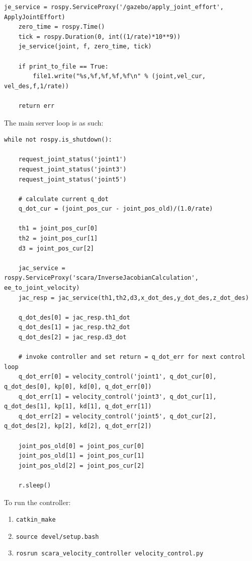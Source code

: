 \documentclass[10pt]{article}
\begin{document}
\begin{enumerate}
\begin{lstlisting}[style=Matlab-editor,basicstyle=\mlttfamily,escapechar=`]
	je_service = rospy.ServiceProxy('/gazebo/apply_joint_effort', ApplyJointEffort)
	zero_time = rospy.Time()
	tick = rospy.Duration(0, int((1/rate)*10**9))
	je_service(joint, f, zero_time, tick)
	
	if print_to_file == True:
		file1.write("%s,%f,%f,%f,%f\n" % (joint,vel_cur, vel_des,f,1/rate)) 
	
	return err
\end{lstlisting}	

	The main server loop is as such:
	
\begin{lstlisting}[style=Matlab-editor,basicstyle=\mlttfamily,escapechar=`]
while not rospy.is_shutdown():

	request_joint_status('joint1')
	request_joint_status('joint3')
	request_joint_status('joint5')
	
	# calculate current q_dot
	q_dot_cur = (joint_pos_cur - joint_pos_old)/(1.0/rate)
	
	th1 = joint_pos_cur[0]
	th2 = joint_pos_cur[1]
	d3 = joint_pos_cur[2]
	
	jac_service = rospy.ServiceProxy('scara/InverseJacobianCalculation', ee_to_joint_velocity)
	jac_resp = jac_service(th1,th2,d3,x_dot_des,y_dot_des,z_dot_des)
	
	q_dot_des[0] = jac_resp.th1_dot
	q_dot_des[1] = jac_resp.th2_dot
	q_dot_des[2] = jac_resp.d3_dot
	
	# invoke controller and set return = q_dot_err for next control loop
	q_dot_err[0] = velocity_control('joint1', q_dot_cur[0], q_dot_des[0], kp[0], kd[0], q_dot_err[0])
	q_dot_err[1] = velocity_control('joint3', q_dot_cur[1], q_dot_des[1], kp[1], kd[1], q_dot_err[1])
	q_dot_err[2] = velocity_control('joint5', q_dot_cur[2], q_dot_des[2], kp[2], kd[2], q_dot_err[2])
	
	joint_pos_old[0] = joint_pos_cur[0]
	joint_pos_old[1] = joint_pos_cur[1]
	joint_pos_old[2] = joint_pos_cur[2]
	
	r.sleep()
\end{lstlisting}
	
	To run the controller:
	
	\begin{enumerate}
		\item \texttt{catkin\_make}
		\item \texttt{source devel/setup.bash}
		\item \texttt{rosrun scara\_velocity\_controller velocity\_control.py}
	\end{enumerate}


\end{enumerate}
\end{document}
